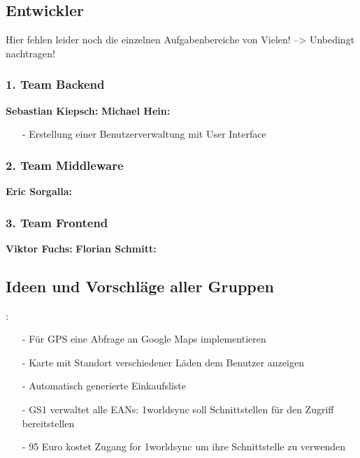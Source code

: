 \documentclass[12pt,a4paper]{article}
\begin{document}
\subsection{Entwickler}
 Hier fehlen leider noch die einzelnen Aufgabenbereiche von Vielen! --> Unbedingt nachtragen!
 
\subsubsection*{1. Team Backend}
\textbf{Sebastian Kiepsch:}
\newline
\textbf{Michael Hein:}
\begin{itemize}
\item[-]Erstellung einer Benutzerverwaltung mit User Interface
\end{itemize}

\subsubsection*{2. Team Middleware}
\textbf{Eric Sorgalla:}


\subsubsection*{3. Team Frontend}
\textbf{Viktor Fuchs:}
\newline 
\textbf{Florian Schmitt:}


\subsection{Ideen und Vorschläge aller Gruppen}:
\begin{itemize}
\item[-] Für GPS eine Abfrage an Google Maps implementieren
\item[-] Karte mit Standort verschiedener Läden dem Benutzer anzeigen
\item[-] Automatisch generierte Einkaufsliste
\item[-] GS1 verwaltet alle EANs: 1worldsync soll Schnittstellen für den Zugriff bereitstellen
\item[-] 95 Euro kostet Zugang for 1worldsync um ihre Schnittstelle zu verwenden
\end{itemize}

\newpage
\end{document}
